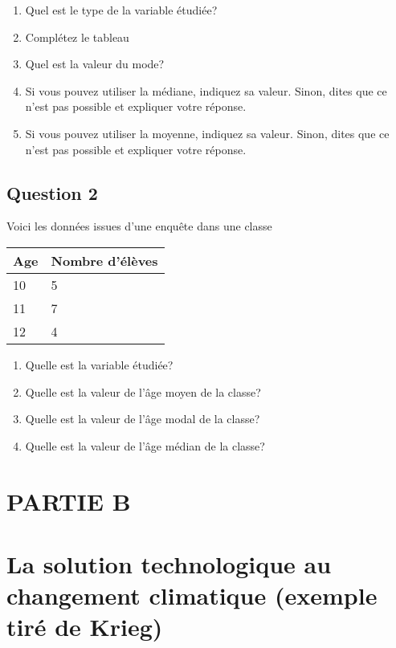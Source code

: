 \documentclass[
]{article}
\providecommand{\tightlist}{%
  \setlength{\itemsep}{0pt}\setlength{\parskip}{0pt}}
\begin{document}
\begin{enumerate}
\def\labelenumi{\arabic{enumi}.}
\tightlist
\item
  Quel est le type de la variable étudiée?
\item
  Complétez le tableau
\item
  Quel est la valeur du mode?
\item
  Si vous pouvez utiliser la médiane, indiquez sa valeur. Sinon, dites
  que ce n'est pas possible et expliquer votre réponse.
\item
  Si vous pouvez utiliser la moyenne, indiquez sa valeur. Sinon, dites
  que ce n'est pas possible et expliquer votre réponse.
\end{enumerate}

\hypertarget{question-2}{%
\subsection{Question 2}\label{question-2}}

Voici les données issues d'une enquête dans une classe

\begin{longtable}[]{@{}ll@{}}
\toprule
Age & Nombre d'élèves\tabularnewline
\midrule
\endhead
10 & 5\tabularnewline
11 & 7\tabularnewline
12 & 4\tabularnewline
\bottomrule
\end{longtable}

\begin{enumerate}
\def\labelenumi{\arabic{enumi}.}
\tightlist
\item
  Quelle est la variable étudiée?
\item
  Quelle est la valeur de l'âge moyen de la classe?
\item
  Quelle est la valeur de l'âge modal de la classe?
\item
  Quelle est la valeur de l'âge médian de la classe?
\end{enumerate}

\hypertarget{partie-b}{%
\section{PARTIE B}\label{partie-b}}

\hypertarget{la-solution-technologique-au-changement-climatique-exemple-tiruxe9-de-krieg}{%
\section{La solution technologique au changement climatique (exemple
tiré de
Krieg)}\label{la-solution-technologique-au-changement-climatique-exemple-tiruxe9-de-krieg}}
\end{document}
